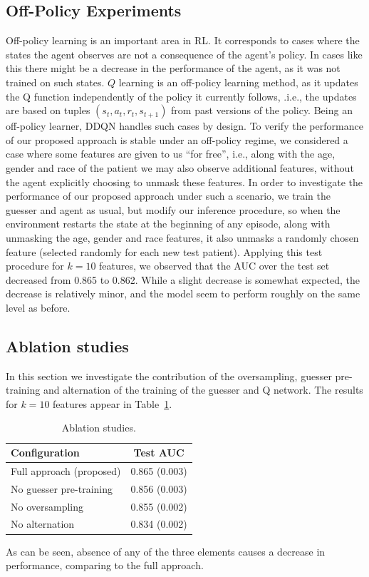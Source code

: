 \documentclass[reqno,11pt]{article}
\begin{document}
\subsection{Off-Policy Experiments}
Off-policy learning is an important area in RL. It corresponds to cases where the states the agent observes are not a consequence of the agent's policy. 
In cases like this there might be a decrease in the performance of the agent, as it was not trained on such states.
$Q$ learning is an off-policy learning method, as it updates the Q function independently of the policy it currently follows, .i.e., the updates are based on tuples $(s_t, a_t, r_t, s_{t+1})$ from past versions of the policy.
Being an off-policy learner, DDQN handles such cases by design.
To verify the performance of our proposed approach is stable under an off-policy regime, we considered a case where some features are given to us ``for free'', i.e., along with the age, gender and race of the patient we may also observe additional features, without the agent explicitly choosing to unmask these features.
In order to investigate the performance of our proposed approach under such a scenario, we train the guesser and agent as usual, but modify our inference procedure, so when the environment restarts the state at the beginning of any episode, along with unmasking the age, gender and race features, it also unmasks a randomly chosen feature (selected randomly for each new test patient).
Applying this test procedure for $k=10$ features, we observed that the AUC over the test set decreased from 0.865 to 0.862. While a slight decrease is somewhat expected, the decrease is relatively minor, and the model seem to perform roughly on the same level as before. 

\subsection{Ablation studies}
In this section we investigate the contribution of the oversampling, guesser pre-training and alternation of the training of the guesser and Q network. The results for $k=10$ features appear in Table~\ref{tab:ablation}.

\begin{table}[h!]
\centering
\begin{tabular}{|| l | c ||} 
 \hline
 Configuration & Test AUC \\ [0.5ex] 
 \hline\hline
  Full approach (proposed)       & 0.865 (0.003)   \\ [0.5ex] 
  No guesser pre-training         & 0.856 (0.003)   \\ [0.5ex]
  No oversampling                  & 0.855 (0.002)   \\ [0.5ex] 
  No alternation                      & 0.834 (0.002)   \\ [0.5ex]  
 \hline
\end{tabular}
\caption{Ablation studies.}
\label{tab:ablation}
\end{table}
As can be seen, absence of any of the three elements causes a decrease in performance, comparing to the full approach.
\end{document}
